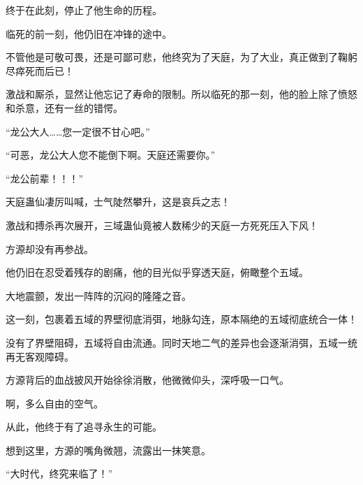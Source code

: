 \begin{this_body}
终于在此刻，停止了他生命的历程。

临死的前一刻，他仍旧在冲锋的途中。

不管他是可敬可畏，还是可鄙可悲，他终究为了天庭，为了大业，真正做到了鞠躬尽瘁死而后已！

激战和厮杀，显然让他忘记了寿命的限制。所以临死的那一刻，他的脸上除了愤怒和杀意，还有一丝的错愕。

“龙公大人……您一定很不甘心吧。”

“可恶，龙公大人您不能倒下啊。天庭还需要你。”

“龙公前辈！！！”

天庭蛊仙凄厉叫喊，士气陡然攀升，这是哀兵之志！

激战和搏杀再次展开，三域蛊仙竟被人数稀少的天庭一方死死压入下风！

方源却没有再参战。

他仍旧在忍受着残存的剧痛，他的目光似乎穿透天庭，俯瞰整个五域。

大地震颤，发出一阵阵的沉闷的隆隆之音。

这一刻，包裹着五域的界壁彻底消弭，地脉勾连，原本隔绝的五域彻底统合一体！

没有了界壁阻碍，五域将自由流通。同时天地二气的差异也会逐渐消弭，五域一统再无客观障碍。

方源背后的血战披风开始徐徐消散，他微微仰头，深呼吸一口气。

啊，多么自由的空气。

从此，他终于有了追寻永生的可能。

想到这里，方源的嘴角微翘，流露出一抹笑意。

“大时代，终究来临了！”

\end{this_body}
